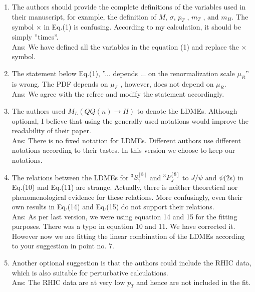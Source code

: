 \documentclass[aps,prc,preprint,superscriptaddress,showpacs,showkeys,amsmath]{revtex4-1}
\begin{document}
\begin{enumerate}

\item The authors should provide the complete definitions of the variables used in their
manuscript, for example, the definition of $M$, $\sigma$, $p_T$ , $m_T$ , and $m_H$. 
The symbol $\times$ in Eq.(1) is confusing. According to my calculation, it should be 
simply ”times”.\\
{\color{blue}
Ans: We have defined all the variables in the equation (1) and replace the $\times$
symbol. 
}
\item The statement below Eq.(1), ”... depends ... on the renormalization scale $\mu_R$” 
is wrong. The PDF depends on $\mu_F$ , however, does not depend on $\mu_R$. \\
{\color{blue}
Ans: We agree with the refree and modify the statement accordingly.
}
\item The authors used $M_L(QQ(n) \rightarrow H)$ to denote the LDMEs. Although optional, 
I believe that using the generally used notations would improve the readability of 
their paper. \\
{\color{blue}
Ans: There is no fixed notation for LDMEs. Different authors use different notations according to
their tastes. In this version we choose to keep our notations. 
}

\item The relations between the LDMEs for $^3S_1^{[8]}$ and $^3P^{[8]}_J$ to $J/\psi$  
and  $\psi$(2s) in Eq.(10) and Eq.(11) are strange. Actually, there is neither 
theoretical nor phenomenological evidence for these relations. More confusingly, 
even their own results in Eq.(14) and Eq.(15) do not support their relations.\\
{\color{blue}
Ans: As per last version, we were using equation 14 and 15 for the fitting purposes. There was
a typo in equation 10 and 11. We have corrected it. However now we are fitting the 
linear combination of the LDMEs according to your suggestion in point no. 7.
}
\item Another optional suggestion is that the authors could include the RHIC data, 
  which is also suitable for perturbative calculations.\\
  {\color{blue}
    Ans: The RHIC data are at very low $p_{T}$ and hence are not included in the fit.
  }



\end{enumerate}
\end{document}

